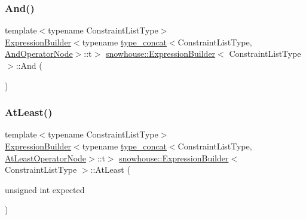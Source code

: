 \mbox{\label{structsnowhouse_1_1ExpressionBuilder_a0f0a34d1d1836d2352a72e8aa7cb7cc2}} 
\subsubsection{\texorpdfstring{And()}{And()}}
{\footnotesize\ttfamily template$<$typename Constraint\+List\+Type$>$ \\
\mbox{\hyperlink{structsnowhouse_1_1ExpressionBuilder}{Expression\+Builder}}$<$typename \mbox{\hyperlink{structsnowhouse_1_1type__concat}{type\+\_\+concat}}$<$Constraint\+List\+Type, \mbox{\hyperlink{structsnowhouse_1_1ExpressionBuilder_acfa4ad415e3fac4f1a161d56268a99fc}{And\+Operator\+Node}}$>$\+::t$>$ \mbox{\hyperlink{structsnowhouse_1_1ExpressionBuilder}{snowhouse\+::\+Expression\+Builder}}$<$ Constraint\+List\+Type $>$\+::And (\begin{DoxyParamCaption}{ }\end{DoxyParamCaption})\hspace{0.3cm}{\ttfamily [inline]}}

\mbox{\label{structsnowhouse_1_1ExpressionBuilder_a3da53251d52f2e5052634132b687ab2f}} 
\subsubsection{\texorpdfstring{AtLeast()}{AtLeast()}}
{\footnotesize\ttfamily template$<$typename Constraint\+List\+Type$>$ \\
\mbox{\hyperlink{structsnowhouse_1_1ExpressionBuilder}{Expression\+Builder}}$<$typename \mbox{\hyperlink{structsnowhouse_1_1type__concat}{type\+\_\+concat}}$<$Constraint\+List\+Type, \mbox{\hyperlink{structsnowhouse_1_1ExpressionBuilder_aaf839b9ebd0daa72220cc48bfaaea83f}{At\+Least\+Operator\+Node}}$>$\+::t$>$ \mbox{\hyperlink{structsnowhouse_1_1ExpressionBuilder}{snowhouse\+::\+Expression\+Builder}}$<$ Constraint\+List\+Type $>$\+::At\+Least (\begin{DoxyParamCaption}\item[{unsigned int}]{expected }\end{DoxyParamCaption})\hspace{0.3cm}{\ttfamily [inline]}}

